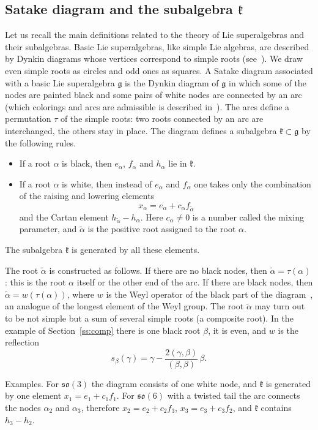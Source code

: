 \documentclass[12pt,a4paper]{article}
\newcommand{\g}{\mathfrak{g}}
\newcommand{\kk}{\mathfrak{k}}
\newcommand{\so}{\mathfrak{so}}
\newcommand{\ta}{\tilde\alpha}
\begin{document}
\subsection{Satake diagram and the subalgebra $\kk$}\label{ss:satake}
Let us recall the main definitions related to the theory of Lie superalgebras and their subalgebras. Basic Lie superalgebras, like simple Lie algebras, are described by Dynkin diagrams whose vertices correspond to simple roots (see~\cite{CW}). We draw even simple roots as circles and odd ones as squares.
A Satake diagram associated with a basic Lie superalgebra $\g$ is the Dynkin diagram of $\g$ in which some of the nodes are painted black and some
pairs of white nodes are connected by an arc (which colorings and arcs are admissible is described in~\cite[Section~4]{AMS}). The arcs define a permutation $\tau$ of the simple roots: two roots
connected by an arc are interchanged, the others stay in place. The diagram defines a subalgebra $\kk\subset\g$ by the following rules.
\begin{itemize}
\item If a root $\alpha$ is black, then $e_\alpha$, $f_\alpha$ and $h_\alpha$ lie in $\kk$.
\item If a root $\alpha$ is white, then instead of $e_\alpha$ and $f_\alpha$ one takes only the combination of the raising and lowering elements
\begin{equation}\label{eq:cl}
x_\alpha=e_\alpha+c_\alpha f_{\ta}
\end{equation}
and the Cartan element $h_{\ta}-h_\alpha$. Here $c_\alpha\neq0$ is a number called the mixing parameter,
and $\ta$ is the positive root assigned to the root $\alpha$.
\end{itemize}
The subalgebra $\kk$ is generated by all these elements.

The root $\ta$ is constructed as follows. If there are no black nodes, then $\ta=\tau(\alpha)$: this is the root $\alpha$ itself or the other end of the arc. If there are black nodes, then $\ta=w(\tau(\alpha))$, where $w$ is
the Weyl operator of the black part of the diagram~\cite[Section~4.1]{AMS}, an analogue of the longest element of the Weyl group. The root $\ta$
may turn out to be not simple but a sum of several simple roots (a composite root). In the example of Section~\ref{ss:comp} there is one black
root $\beta$, it is even, and $w$ is the reflection
\[
s_\beta(\gamma)=\gamma-\frac{2(\gamma,\beta)}{(\beta,\beta)}\,\beta .
\]



Examples. For $\so(3)$ the diagram consists of one white node, and $\kk$ is generated by one element
$x_1=e_1+c_1f_1$. For $\so(6)$ with a twisted tail the arc connects the nodes $\alpha_2$ and $\alpha_3$, therefore
$x_2=e_2+c_2f_3$, $x_3=e_3+c_3f_2$, and $\kk$ contains $h_3-h_2$.
\end{document}
